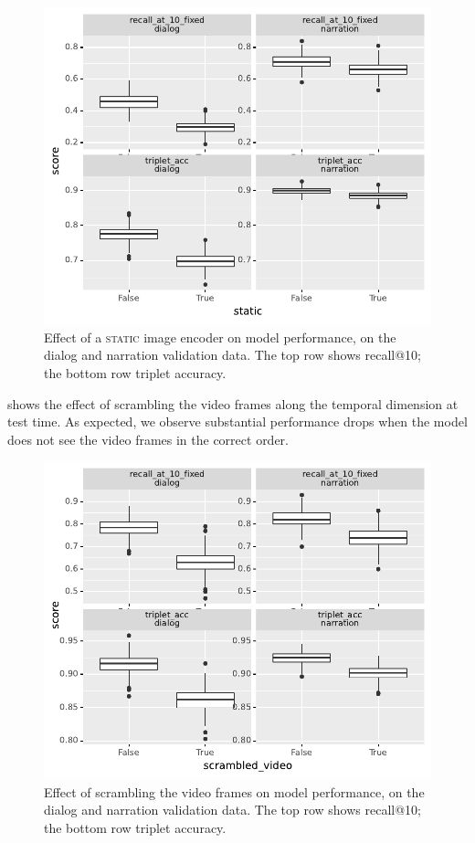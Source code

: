 \begin{figure}[htb]
  \centering
  \includegraphics[width=\columnwidth]{results/ablations/static.pdf}
  \caption{Effect of a \textsc{static} image encoder on model performance, on 
  the dialog and narration validation data. The top row shows recall@10;
          the bottom row triplet accuracy.}
  \label{fig:static}
\end{figure}

 shows the effect of scrambling the video frames 
along the temporal dimension at test time. As expected, we observe substantial 
performance drops when the model does not see the video frames in 
the correct order.
\begin{figure}[htb]
	\centering
	\includegraphics[width=\columnwidth]{results/ablations/scrambled_video.pdf}
	\caption{Effect of scrambling the video frames on model performance, on the 
	dialog and narration validation data. The top row shows recall@10;
		the bottom row triplet accuracy.}
	\label{fig:scrambled_video}
\end{figure}

